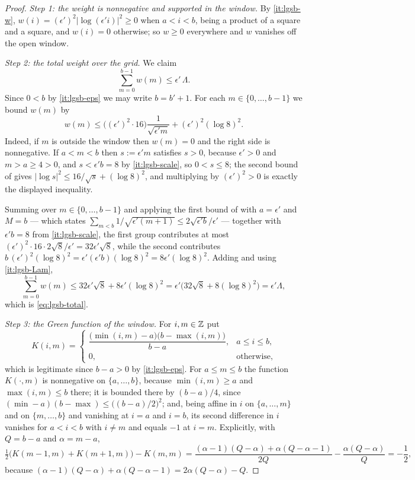 \begin{proof}
\emph{Step 1: the weight is nonnegative and supported in the window.} By
\ref{it:lgsb-w}, $w(i)=(\epsilon')^2|\log(\epsilon'i)|^2\ge0$ when $a<i<b$,
being a product of a square and a square, and $w(i)=0$ otherwise; so $w\ge0$
everywhere and $w$ vanishes off the open window.

\emph{Step 2: the total weight over the grid.} We claim
\begin{equation}\label{eq:lgsb-total}
  \sum_{m=0}^{b-1}w(m)\le\epsilon'\,\Lambda .
\end{equation}
Since $0<b$ by \ref{it:lgsb-eps} we may write $b=b'+1$. For each
$m\in\{0,\dots,b-1\}$ we bound $w(m)$ by
\[
  w(m)\le\bigl((\epsilon')^2\cdot16\bigr)\frac1{\sqrt{\epsilon'm}}
    +(\epsilon')^2(\log 8)^2 .
\]
Indeed, if $m$ is outside the window then $w(m)=0$ and the right side is
nonnegative. If $a<m<b$ then $s:=\epsilon'm$ satisfies $s>0$, because
$\epsilon'>0$ and $m>a\ge4>0$, and $s<\epsilon'b=8$ by \ref{it:lgsb-scale}, so
$0<s\le8$; the second bound of  gives
$|\log s|^2\le16/\sqrt s+(\log 8)^2$, and multiplying by $(\epsilon')^2>0$ is
exactly the displayed inequality.

Summing over $m\in\{0,\dots,b-1\}$ and applying the first bound of
 with $a=\epsilon'$ and $M=b$ --- which states
$\sum_{m<b}1/\sqrt{\epsilon'(m+1)}\le2\sqrt{\epsilon'b}/\epsilon'$ --- together
with $\epsilon'b=8$ from \ref{it:lgsb-scale}, the first group contributes at
most $(\epsilon')^2\cdot16\cdot2\sqrt8/\epsilon'=32\epsilon'\sqrt8$, while the
second contributes $b\,(\epsilon')^2(\log 8)^2=\epsilon'(\epsilon'b)(\log 8)^2
=8\epsilon'(\log 8)^2$. Adding and using \ref{it:lgsb-Lam},
\[
  \sum_{m=0}^{b-1}w(m)
   \le32\epsilon'\sqrt8+8\epsilon'(\log 8)^2
   =\epsilon'\bigl(32\sqrt8+8(\log 8)^2\bigr)=\epsilon'\Lambda ,
\]
which is \eqref{eq:lgsb-total}.

\emph{Step 3: the Green function of the window.} For $i,m\in\mathbb{Z}$ put
\[
  K(i,m)=\begin{cases}
    \dfrac{\bigl(\min(i,m)-a\bigr)\bigl(b-\max(i,m)\bigr)}{b-a},
      & a\le i\le b,\\[2mm]
    0, & \text{otherwise},
  \end{cases}
\]
which is legitimate since $b-a>0$ by \ref{it:lgsb-eps}. For $a\le m\le b$ the
function $K(\cdot,m)$ is nonnegative on $\{a,\dots,b\}$, because
$\min(i,m)\ge a$ and $\max(i,m)\le b$ there; it is bounded there by
$(b-a)/4$, since $(\min-a)(b-\max)\le\bigl((b-a)/2\bigr)^2$; and, being affine
in $i$ on $\{a,\dots,m\}$ and on $\{m,\dots,b\}$ and vanishing at $i=a$ and
$i=b$, its second difference in $i$ vanishes for $a<i<b$ with $i\ne m$ and
equals $-1$ at $i=m$. Explicitly, with $Q=b-a$ and $\alpha=m-a$,
\[
  \tfrac12\bigl(K(m-1,m)+K(m+1,m)\bigr)-K(m,m)
   =\frac{(\alpha-1)(Q-\alpha)+\alpha(Q-\alpha-1)}{2Q}
     -\frac{\alpha(Q-\alpha)}{Q}=-\frac12 ,
\]
because $(\alpha-1)(Q-\alpha)+\alpha(Q-\alpha-1)=2\alpha(Q-\alpha)-Q$.


\end{proof}
